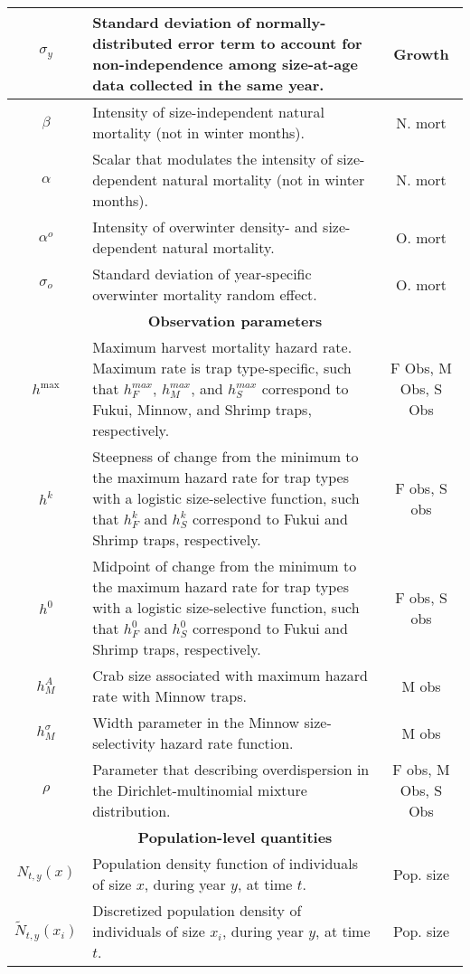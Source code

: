 \documentclass{article}
\begin{document}
\begin{longtable}{||c p{9cm} c||}
 \hline
 $\sigma_y$ & Standard deviation of normally-distributed error term to account for non-independence among size-at-age data collected in the same year. & Growth \\ 
 \hline
 $\beta$ & Intensity of size-independent natural mortality (not in winter months). & N. mort \\ 
 \hline
 $\alpha$ & Scalar that modulates the intensity of size-dependent natural mortality (not in winter months). & N. mort \\ 
 \hline
 $\alpha^o$ & Intensity of overwinter density- and size-dependent natural mortality. & O. mort \\ 
 \hline
 \hline
 $\sigma_o$ & Standard deviation of year-specific overwinter mortality random effect. & O. mort \\ 
 \hline\hline
 \multicolumn{3}{||c||}{\textbf{Observation parameters}} \\ 
 \hline
 $h^{\text{max}}$ & Maximum harvest mortality hazard rate. Maximum rate is trap type-specific, such that $h_F^{max}$, $h_M^{max}$, and $h_S^{max}$ correspond to Fukui, Minnow, and Shrimp traps, respectively. & F Obs, M Obs, S Obs \\ 
 \hline
 $h^{k}$ & Steepness of change from the minimum to the maximum hazard rate for trap types with a logistic size-selective function, such that $h_F^{k}$ and $h_S^{k}$ correspond to Fukui and Shrimp traps, respectively. & F obs, S obs \\ 
 \hline
 $h^{0}$ & Midpoint of change from the minimum to the maximum hazard rate for trap types with a logistic size-selective function, such that $h_F^{0}$ and $h_S^{0}$ correspond to Fukui and Shrimp traps, respectively. & F obs, S obs \\ 
 \hline
 $h_M^{A}$ & Crab size associated with maximum hazard rate with Minnow traps. & M obs \\ 
 \hline
 $h_M^{\sigma}$ & Width parameter in the Minnow size-selectivity hazard rate function. & M obs \\ 
 \hline
 $\rho$ & Parameter that describing overdispersion in the Dirichlet-multinomial mixture distribution. & F obs, M Obs, S Obs \\
 \hline\hline
 \multicolumn{3}{||c||}{\textbf{Population-level quantities}} \\ 
 \hline
 $N_{t,y}(x)$ & Population density function of individuals of size $x$, during year $y$, at time $t$. & Pop. size \\ 
 \hline
 $\tilde{N}_{t,y}(x_i)$ & Discretized population density of individuals of size $x_i$, during year $y$, at time $t$. & Pop. size \\ 

\end{longtable}
\end{document}
